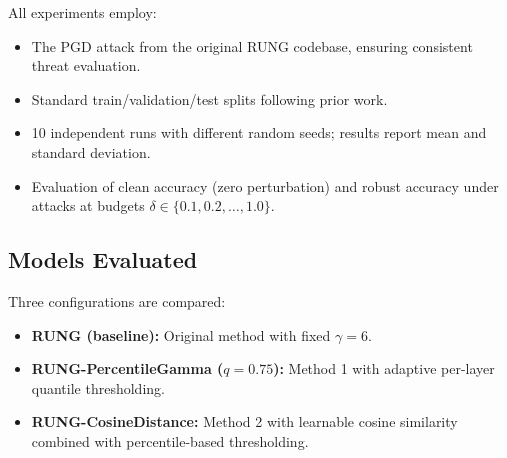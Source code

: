 \documentclass[sigconf]{acmart}
\begin{document}

All experiments employ:
\begin{itemize}
\item The PGD attack from the original RUNG codebase, ensuring consistent threat evaluation.
\item Standard train/validation/test splits following prior work.
\item 10 independent runs with different random seeds; results report mean and standard deviation.
\item Evaluation of clean accuracy (zero perturbation) and robust accuracy under attacks at budgets $\delta \in \{0.1, 0.2, \ldots, 1.0\}$.
\end{itemize}

\subsection{Models Evaluated}

Three configurations are compared:
\begin{itemize}
\item \textbf{RUNG (baseline):} Original method with fixed $\gamma = 6$.
\item \textbf{RUNG-PercentileGamma ($q=0.75$):} Method 1 with adaptive per-layer quantile thresholding.
\item \textbf{RUNG-CosineDistance:} Method 2 with learnable cosine similarity combined with percentile-based thresholding.
\end{itemize}
\end{document}
